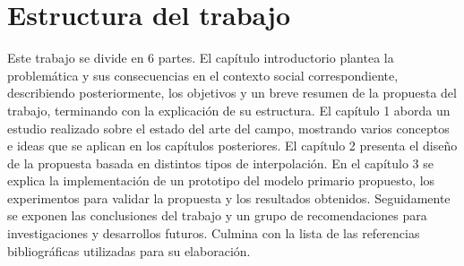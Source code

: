 \section{Estructura del trabajo}
Este trabajo se divide en 6 partes. El capítulo introductorio plantea la
problemática y sus consecuencias en el contexto social correspondiente, describiendo posteriormente, los objetivos y un breve resumen de la
propuesta del trabajo, terminando con la explicación de su estructura. El capítulo
1 aborda un estudio realizado sobre el estado del arte del campo, mostrando varios
conceptos e ideas que se aplican en los capítulos posteriores. El capítulo 2 presenta el diseño
de la propuesta basada en distintos tipos de interpolación. En el capítulo 3 se explica la implementación de un prototipo del modelo primario
propuesto, los experimentos para validar la propuesta y los resultados obtenidos. Seguidamente se exponen las conclusiones del trabajo y un grupo de recomendaciones para investigaciones y desarrollos futuros. Culmina con la lista de las referencias bibliográficas utilizadas para su elaboración.
